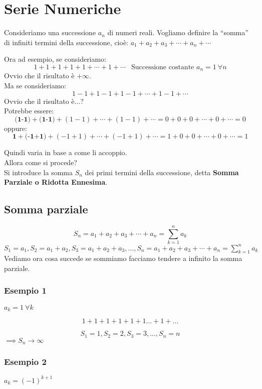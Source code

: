 \documentclass[../main.tex]{subfiles}
\begin{document}
\section{Serie Numeriche}
Consideriamo una successione $a_n$ di numeri reali. Vogliamo definire la
``somma'' di infiniti termini della successione, cioè: $a_1 + a_2 + a_3 +
    \cdots + a_n + \cdots$
\begin{center}

    Ora ad esempio, se consideriamo:
    \[
        1+1+1+1+1+\cdots+1+\cdots \ \ \text{ Successione costante $a_n = 1 \ \forall n$}
    \]
    Ovvio che il risultato è $+\infty$.\\ Ma se consideriamo:
    \[
        1-1+1-1+1-1+\cdots+1-1+\cdots
    \]
    Ovvio che il risultato è$\ldots$?\\ Potrebbe essere:
    \[
        \textbf{(1-1)}+\textbf{(1-1)}+(1-1)+\cdots+(1-1)+\cdots = 0+0+0+\cdots+0+\cdots = 0
    \]
    oppure:
    \[
        \textbf{1}+\textbf{(-1+1)}+(-1+1)+\cdots+(-1+1)+\cdots = 1+0+0+\cdots+0+\cdots = 1
    \]

\end{center}
Quindi varia in base a come li accoppio.\\ Allora come si procede?\\ Si
introduce la somma $S_n$ dei primi termini della successione, detta
\textbf{Somma Parziale o Ridotta Ennesima}.

\subsection{Somma parziale}

\[
    S_n = a_1 + a_2 + a_3 + \cdots + a_n = \sum_{k=1}^n a_k
\]
$S_1 = a_1, S_2 = a_1 + a_2, S_3 = a_1+a_2+a_3,\ldots,S_n = a_1+a_2+a_3+\cdots+a_n=\sum_{k=1}^{n} a_k$\\
Vediamo ora cosa succede se sommiamo facciamo tendere a infinito la somma
parziale.

\subsubsection{Esempio 1}
$a_k = 1\ \forall k$

\[
    1+1+1+1+1+1\ldots+1+\ldots\]

\[S_1 = 1, S_2 = 2, S_3 = 3,\ldots, S_n = n\]
$\implies S_n\to\infty$

\subsubsection{Esempio 2}
$a_k = (-1)^{k+1}$
\end{document}
